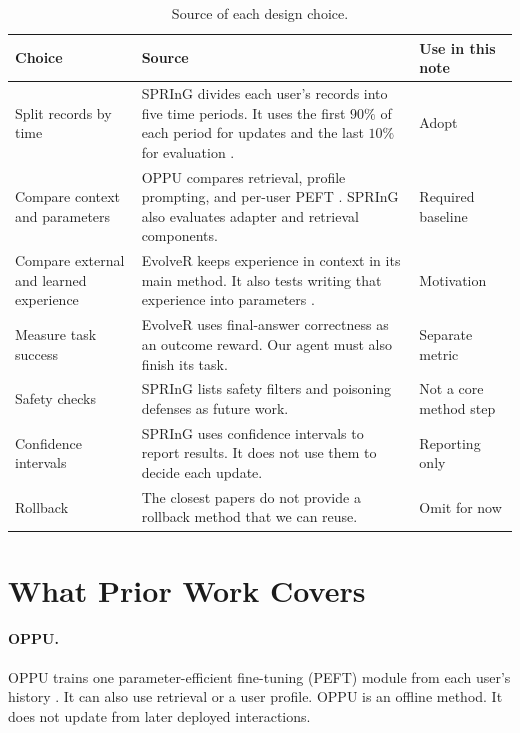 \documentclass[11pt]{article}
\begin{document}
\begin{table}[ht]
  \centering
  \caption{Source of each design choice.}
  \begin{tabularx}{\textwidth}{@{}L{0.20\textwidth}L{0.52\textwidth}Y@{}}
    \toprule
    Choice & Source & Use in this note \\
    \midrule
    Split records by time &
    SPRInG divides each user's records into five time periods. It uses the
    first \(90\%\) of each period for updates and the last \(10\%\) for
    evaluation \cite{kim2026spring}. &
    Adopt \\
    Compare context and parameters &
    OPPU compares retrieval, profile prompting, and per-user PEFT
    \cite{tan2024oppu}. SPRInG also evaluates adapter and retrieval
    components. &
    Required baseline \\
    Compare external and learned experience &
    EvolveR keeps experience in context in its main method. It also tests
    writing that experience into parameters \cite{wu2025evolver}. &
    Motivation \\
    Measure task success &
    EvolveR uses final-answer correctness as an outcome reward. Our agent must
    also finish its task. &
    Separate metric \\
    Safety checks &
    SPRInG lists safety filters and poisoning defenses as future work. &
    Not a core method step \\
    Confidence intervals &
    SPRInG uses confidence intervals to report results. It does not use them
    to decide each update. &
    Reporting only \\
    Rollback &
    The closest papers do not provide a rollback method that we can reuse. &
    Omit for now \\
    \bottomrule
  \end{tabularx}
\end{table}

\section{What Prior Work Covers}

\paragraph{OPPU.}
OPPU trains one parameter-efficient fine-tuning (PEFT) module from each user's
history \cite{tan2024oppu}. It can also use retrieval or a user profile. OPPU
is an offline method. It does not update from later deployed interactions.
\end{document}
